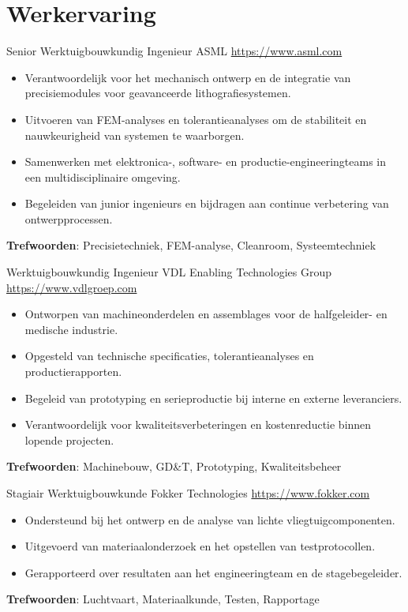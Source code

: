 \documentclass[a4paper, serif, 10pt]{moderncv}
\begin{document}
\section{Werkervaring}

        {Senior Werktuigbouwkundig Ingenieur}
        {ASML}
        {\url{https://www.asml.com}}
        {}
        {\begin{itemize}
\item Verantwoordelijk voor het mechanisch ontwerp en de integratie van precisiemodules voor geavanceerde lithografiesystemen.
\item Uitvoeren van FEM-analyses en tolerantieanalyses om de stabiliteit en nauwkeurigheid van systemen te waarborgen.
\item Samenwerken met elektronica-, software- en productie-engineeringteams in een multidisciplinaire omgeving.
\item Begeleiden van junior ingenieurs en bijdragen aan continue verbetering van ontwerpprocessen.
\end{itemize}
\textbf{Trefwoorden}: Precisietechniek, FEM-analyse, Cleanroom, Systeemtechniek}

        {Werktuigbouwkundig Ingenieur}
        {VDL Enabling Technologies Group}
        {\url{https://www.vdlgroep.com}}
        {}
        {\begin{itemize}
\item Ontworpen van machineonderdelen en assemblages voor de halfgeleider- en medische industrie.
\item Opgesteld van technische specificaties, tolerantieanalyses en productierapporten.
\item Begeleid van prototyping en serieproductie bij interne en externe leveranciers.
\item Verantwoordelijk voor kwaliteitsverbeteringen en kostenreductie binnen lopende projecten.
\end{itemize}
\textbf{Trefwoorden}: Machinebouw, GD\&T, Prototyping, Kwaliteitsbeheer}

        {Stagiair Werktuigbouwkunde}
        {Fokker Technologies}
        {\url{https://www.fokker.com}}
        {}
        {\begin{itemize}
\item Ondersteund bij het ontwerp en de analyse van lichte vliegtuigcomponenten.
\item Uitgevoerd van materiaalonderzoek en het opstellen van testprotocollen.
\item Gerapporteerd over resultaten aan het engineeringteam en de stagebegeleider.
\end{itemize}
\textbf{Trefwoorden}: Luchtvaart, Materiaalkunde, Testen, Rapportage}
\end{document}
